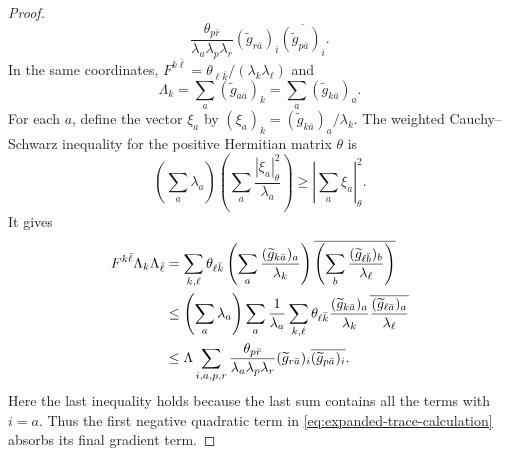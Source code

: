 \documentclass[10pt,a4paper]{amsart}
\begin{document}
\begin{proof}
\[ \frac{\theta_{p\bar r}}{\lambda_a\lambda_p\lambda_r}
 (\widetilde g_{r\bar a})_i
 \overline{(\widetilde g_{p\bar a})_i}.
\]
In the same coordinates,
$F^{k\bar\ell}=\theta_{\ell\bar k}/(\lambda_k\lambda_\ell)$ and
\[
 \Lambda_k=\sum_a(\widetilde g_{a\bar a})_k
 =\sum_a(\widetilde g_{k\bar a})_a.
\]
For each $a$, define the vector $\xi_a$ by
$(\xi_a)_k=(\widetilde g_{k\bar a})_a/\lambda_k$. The weighted
Cauchy--Schwarz inequality for the positive Hermitian matrix $\theta$
is
\[
 \left(\sum_a\lambda_a\right)
 \left(\sum_a\frac{|\xi_a|_\theta^2}{\lambda_a}\right)
 \geq\left|\sum_a\xi_a\right|_\theta^2.
\]
It gives
\begin{align}
 F^{k\bar\ell}\Lambda_k\Lambda_{\bar\ell}
 &=\sum_{k,\ell}\theta_{\ell\bar k}
 \left(\sum_a\frac{(\widetilde g_{k\bar a})_a}{\lambda_k}\right)
 \overline{\left(\sum_b
 \frac{(\widetilde g_{\ell\bar b})_b}{\lambda_\ell}\right)}
 \notag\\
 &\leq\left(\sum_a\lambda_a\right)
 \sum_a\frac1{\lambda_a}\sum_{k,\ell}
 \theta_{\ell\bar k}
 \frac{(\widetilde g_{k\bar a})_a}{\lambda_k}
 \overline{\frac{(\widetilde g_{\ell\bar a})_a}{\lambda_\ell}}
 \notag\\
 &\leq\Lambda\sum_{i,a,p,r}
 \frac{\theta_{p\bar r}}{\lambda_a\lambda_p\lambda_r}
 (\widetilde g_{r\bar a})_i
 \overline{(\widetilde g_{p\bar a})_i}.
\label{eq:trace-gradient-CS}
\end{align}
Here the last inequality holds because the
last sum contains all the terms with $i=a$.  Thus the first negative
quadratic term in \eqref{eq:expanded-trace-calculation} absorbs its
final gradient term.


\end{proof}
\end{document}
